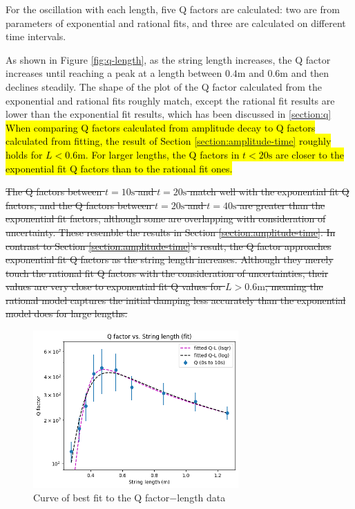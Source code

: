 \documentclass[12pt]{article}
\DeclareRobustCommand{\hlnew}[1]{{\sethlcolor{hlcnew}\hl{#1}}}
\DeclareRobustCommand{\hldel}[1]{{\st{#1}}}
\begin{document}
For the oscillation with each length, five Q factors are calculated: two are from parameters of exponential and rational fits, and three are calculated on different time intervals.

As shown in Figure {\ref{fig:q-length}}, as the string length increases, the Q factor increases until reaching a peak at a length between $0.4\mathrm{m}$ and $0.6\mathrm{m}$ and then declines steadily. The shape of the plot of the Q factor calculated from the exponential and rational fits roughly match, except the rational fit results are lower than the exponential fit results, which has been discussed in {\ref{section:q}} \hlnew{When comparing Q factors calculated from amplitude decay to Q factors calculated from fitting, the result of Section {\ref{section:amplitude-time}} roughly holds for $L<0.6\mathrm{m}$. For larger lengths, the Q factors in $t<20\mathrm{s}$ are closer to the exponential fit Q factors than to the rational fit ones.}

\hldel{The Q factors between $t=10\mathrm{s}$ and $t=20\mathrm{s}$ match well with the exponential fit Q factors, and the Q factors between $t=20\mathrm{s}$ and $t=40\mathrm{s}$ are greater than the exponential fit factors, although some are overlapping with consideration of uncertainty. These resemble the results in Section {\ref{section:amplitude-time}}. In contrast to Section {\ref{section:amplitude-time}}'s result, the Q factor approaches exponential fit Q factors as the string length increases. Although they merely touch the rational fit Q factors with the consideration of uncertainties, their values are very close to exponential fit Q values for $L>0.6\mathrm{m}$, meaning the rational model captures the initial damping less accurately than the exponential model does for large lengths.}

\begin{figure}[!htb]
\begin{center}
\includegraphics[width=0.7\textwidth]{q-length-fit.png}
\caption{Curve of best fit to the Q factor$-$length data}\label{fig:q-length-fit}
\end{center}
\end{figure}
\end{document}
